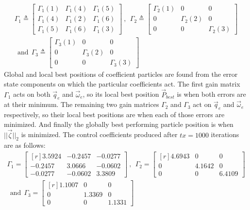 \begin{multline}\label{eq:simulation-attitde-auxpd-coefficients}
\Gamma_1\triangleq \begin{bmatrix}
\Gamma_1(1) & \Gamma_1(4) & \Gamma_1(5)\\
\Gamma_1(4) & \Gamma_1(2) & \Gamma_1(6)\\
\Gamma_1(5) & \Gamma_1(6) & \Gamma_1(3)
\end{bmatrix}~,~~
\Gamma_2\triangleq \begin{bmatrix}
\Gamma_2(1) & 0 & 0\\
0 &\Gamma_2(2) & 0\\
0 & 0 & \Gamma_2(3)
\end{bmatrix}
\\
~~\text{and}~~\Gamma_3\triangleq \begin{bmatrix}
\Gamma_3(1) & 0 & 0\\
0 & \Gamma_3(2) & 0\\
0 & 0 & \Gamma_3(3)
\end{bmatrix}
\end{multline}
Global and local best positions of coefficient particles are found from the error state components on which the particular coefficients act. The first gain matrix $\Gamma_1$ acts on both $\vec{q}_e$ and $\vec{\omega}_e$, so its local best position $\vec{P}_{best}$ is when both errors are at their minimum. The remaining two gain matrices $\Gamma_2$ and $\Gamma_3$ act on $\vec{q}_e$ and $\vec{\omega}_e$ respectively, so their local best positions are when each of those errors are minimized. And finally the globally best performing particle position is when $||\vec{\zeta}||_2$ is minimized. The control coefficients produced after $tx=1000$ iterations are as follows:
\begin{multline}\label{eq:optimized-auxpd}
\Gamma_1=\begin{bmatrix*}[r]
3.5924 & -0.2457 & -0.0277\\
-0.2457 & 3.0666 & -0.0602\\
-0.0277 & -0.0602 & 3.3809
\end{bmatrix*}~,~~\Gamma_2=\begin{bmatrix*}[r]
4.6943 & 0 & 0\\
0 & 4.1642 & 0\\
0 & 0 & 6.4109
\end{bmatrix*}\\
~~\text{and}~~\Gamma_3=\begin{bmatrix*}[r]
1.1007 & 0 & 0\\
0 & 1.3369 & 0 \\
0 & 0 & 1.1331
\end{bmatrix*}
\end{multline}

